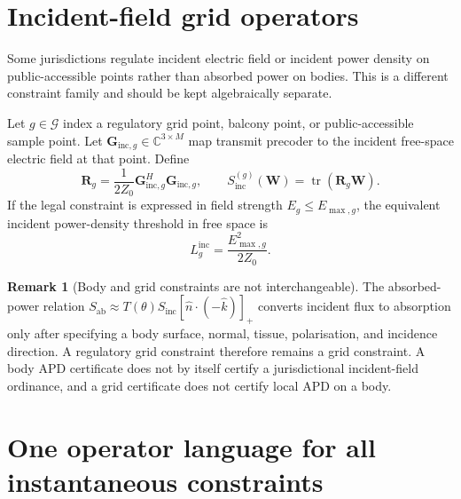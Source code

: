 \documentclass[11pt,a4paper]{article}
\theoremstyle{definition}
\newtheorem{remark}[definition]{Remark}
\theoremstyle{plain}
\newcommand{\W}{\mathbf W}
\newcommand{\R}{\mathbf R}
\newcommand{\Sab}{S_{\mathrm{ab}}}
\newcommand{\Sinc}{S_{\mathrm{inc}}}
\newcommand{\Complex}{\mathbb C}
\newcommand{\tr}{\operatorname{tr}}
\begin{document}
\section{Incident-field grid operators}

Some jurisdictions regulate incident electric field or incident power
density on public-accessible points rather than absorbed power on bodies.
This is a different constraint family and should be kept algebraically
separate.

Let $g\in\mathcal G$ index a regulatory grid point, balcony point, or
public-accessible sample point.  Let
$\mathbf G_{\mathrm{inc},g}\in\Complex^{3\times M}$ map transmit precoder
to the incident free-space electric field at that point.  Define
\begin{equation}\label{eq:Rgrid}
  \R_g=\frac{1}{2Z_0}\mathbf G_{\mathrm{inc},g}^H
  \mathbf G_{\mathrm{inc},g},
  \qquad
  S_{\mathrm{inc}}^{(g)}(\W)=\tr(\R_g\W).
\end{equation}
If the legal constraint is expressed in field strength
$E_g\le E_{\max,g}$, the equivalent incident power-density threshold in
free space is
\begin{equation}
  L_g^{\mathrm{inc}}=\frac{E_{\max,g}^2}{2Z_0}.
\end{equation}

\begin{remark}[Body and grid constraints are not interchangeable]
The absorbed-power relation
$\Sab\approx T(\theta)\Sinc[\hat n\cdot(-\hat k)]_+$ converts incident
flux to absorption only after specifying a body surface, normal, tissue,
polarisation, and incidence direction.  A regulatory grid constraint
therefore remains a grid constraint.  A body APD certificate does not by
itself certify a jurisdictional incident-field ordinance, and a grid
certificate does not certify local APD on a body.
\end{remark}

\section{One operator language for all instantaneous constraints}
\end{document}
